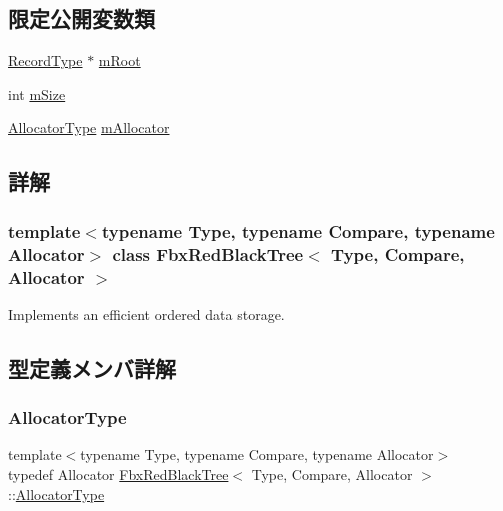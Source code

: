 \subsection*{限定公開変数類}
\begin{DoxyCompactItemize}
\item 
\hyperlink{class_fbx_red_black_tree_1_1_record_type}{Record\+Type} $\ast$ \hyperlink{class_fbx_red_black_tree_a1c8e942b25077e380f93a61aaadd8679}{m\+Root}
\item 
int \hyperlink{class_fbx_red_black_tree_a45b29bfeaffd897c186440fef29b6dfe}{m\+Size}
\item 
\hyperlink{class_fbx_red_black_tree_a62c49ab2e7d602aac98a9413e490ca90}{Allocator\+Type} \hyperlink{class_fbx_red_black_tree_aefc2938bd74cea7e072d344d5b038af1}{m\+Allocator}
\end{DoxyCompactItemize}


\subsection{詳解}
\subsubsection*{template$<$typename Type, typename Compare, typename Allocator$>$\newline
class Fbx\+Red\+Black\+Tree$<$ Type, Compare, Allocator $>$}

Implements an efficient ordered data storage. 

\subsection{型定義メンバ詳解}
\mbox{\label{class_fbx_red_black_tree_a62c49ab2e7d602aac98a9413e490ca90}} 
\subsubsection{\texorpdfstring{Allocator\+Type}{AllocatorType}}
{\footnotesize\ttfamily template$<$typename Type, typename Compare, typename Allocator$>$ \\
typedef Allocator \hyperlink{class_fbx_red_black_tree}{Fbx\+Red\+Black\+Tree}$<$ Type, Compare, Allocator $>$\+::\hyperlink{class_fbx_red_black_tree_a62c49ab2e7d602aac98a9413e490ca90}{Allocator\+Type}}

